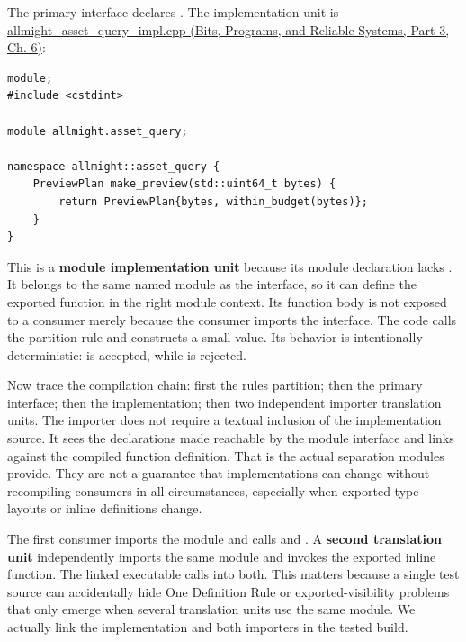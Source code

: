 The primary interface declares . The implementation unit is \href{../01-Bits-Programs-and-Reliable-Systems-P03/main.pdf\#source-file-26fa02737266a08f013cdbb5}{allmight\_asset\_query\_impl.cpp (Bits, Programs, and Reliable Systems, Part 3, Ch. 6)}:

\begin{verbatim}
module;
#include <cstdint>

module allmight.asset_query;

namespace allmight::asset_query {
    PreviewPlan make_preview(std::uint64_t bytes) {
        return PreviewPlan{bytes, within_budget(bytes)};
    }
}
\end{verbatim}

This is a \textbf{module implementation unit} because its module declaration lacks . It belongs to the same named module as the interface, so it can define the exported function in the right module context. Its function body is not exposed to a consumer merely because the consumer imports the interface. The code calls the partition rule and constructs a small value. Its behavior is intentionally deterministic:  is accepted, while  is rejected.

Now trace the compilation chain: first the rules partition; then the primary interface; then the implementation; then two independent importer translation units. The importer does not require a textual inclusion of the implementation source. It sees the declarations made reachable by the module interface and links against the compiled function definition. That is the actual separation modules provide. They are not a guarantee that implementations can change without recompiling consumers in all circumstances, especially when exported type layouts or inline definitions change.

The first consumer imports the module and calls  and . A \textbf{second translation unit} independently imports the same module and invokes the exported inline function. The linked executable calls into both. This matters because a single test source can accidentally hide One Definition Rule or exported-visibility problems that only emerge when several translation units use the same module. We actually link the implementation and both importers in the tested build.

